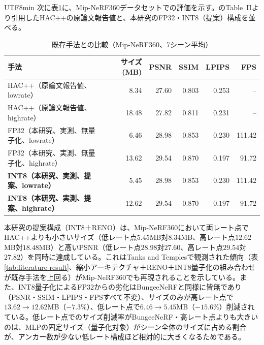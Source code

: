 \documentclass{ieeeaccess}
\begin{document}
\begin{CJK}{UTF8}{min}
次に表\ref{tab:literature-mip360}に、Mip-NeRF360データセットでの評価を示す。\cite{chen2025hacpp}のTable~IIより引用したHAC++の原論文報告値と、本研究のFP32・INT8（提案）構成を並べる。

\begin{table}[!t]
\renewcommand{\arraystretch}{1.2}
\caption{既存手法との比較（Mip-NeRF360、7シーン平均）}
\label{tab:literature-mip360}
\centering
\begin{tabular}{p{4.0cm}rrrrr}
\toprule
手法 & サイズ (MB) & PSNR & SSIM & LPIPS & FPS \\
\midrule
HAC++\cite{chen2025hacpp}（原論文報告値、lowrate） & 8.34 & 27.60 & 0.803 & 0.253 & -- \\
HAC++\cite{chen2025hacpp}（原論文報告値、highrate） & 18.48 & 27.82 & 0.811 & 0.231 & -- \\
\midrule
FP32（本研究、実測、無量子化、lowrate） & 6.46 & 28.98 & 0.853 & 0.230 & 111.42 \\
FP32（本研究、実測、無量子化、highrate） & 13.62 & 29.54 & 0.870 & 0.197 & 91.72 \\
\midrule
\textbf{INT8（本研究、実測、提案、lowrate）} & $\mathbf{5.45}$ & $\mathbf{28.98}$ & $\mathbf{0.853}$ & $\mathbf{0.230}$ & $\mathbf{111.42}$ \\
\textbf{INT8（本研究、実測、提案、highrate）} & $\mathbf{12.62}$ & $\mathbf{29.54}$ & $\mathbf{0.870}$ & $\mathbf{0.197}$ & $\mathbf{91.72}$ \\
\bottomrule
\end{tabular}
\end{table}

本研究の提案構成（INT8＋RENO）は、Mip-NeRF360において両レート点でHAC++よりも小さいサイズ（低レート点$5.45$MB対$8.34$MB、高レート点$12.62$MB対$18.48$MB）と高いPSNR（低レート点$28.98$対$27.60$、高レート点$29.54$対$27.82$）を同時に達成している。これはTanks and Templesで観測された傾向（表\ref{tab:literature-result}、縮小アーキテクチャ＋RENO＋INT8量子化の組み合わせが既存手法を上回る）がMip-NeRF360でも再現されることを示している。また、INT8量子化によるFP32からの劣化はBungeeNeRFと同様に皆無であり（PSNR・SSIM・LPIPS・FPSすべて不変）、サイズのみが高レート点で$13.62\to12.62$MB（$-7.3\%$）、低レート点で$6.46\to5.45$MB（$-15.6\%$）削減されている。低レート点でのサイズ削減率がBungeeNeRF・高レート点よりも大きいのは、MLPの固定サイズ（量子化対象）がシーン全体のサイズに占める割合が、アンカー数が少ない低レート構成ほど相対的に大きくなるためである。


\end{CJK}
\end{document}
